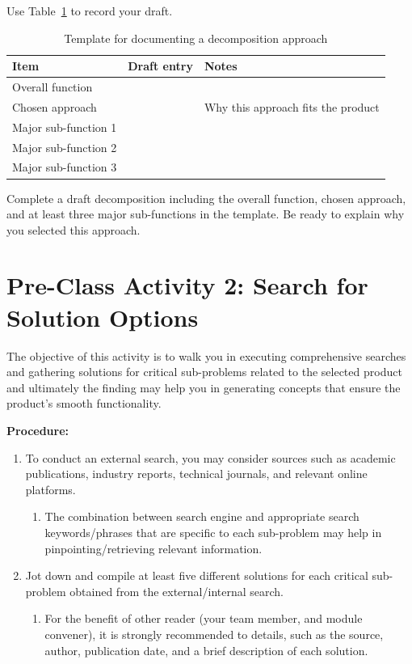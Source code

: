 Use Table~\ref{tab:session9-decomposition-template} to record your draft.

\begin{table}[htbp]
\centering
\caption{Template for documenting a decomposition approach}
\label{tab:session9-decomposition-template}
\renewcommand{\arraystretch}{1.2}
\begin{tabularx}{\textwidth}{|>{\raggedright\arraybackslash}p{}|>{\raggedright\arraybackslash}p{}|X|}
\hline
\textbf{Item} & \textbf{Draft entry} & \textbf{Notes} \\
\hline
Overall function &  &  \\
\hline
Chosen approach &  & Why this approach fits the product \\
\hline
Major sub-function 1 &  &  \\
\hline
Major sub-function 2 &  &  \\
\hline
Major sub-function 3 &  &  \\
\hline
\end{tabularx}
\end{table}

\begin{tcolorbox}[title=Checkpoint]
Complete a draft decomposition including the overall function, chosen approach, and at least three major sub-functions in the template. Be ready to explain why you selected this approach.
\end{tcolorbox}

\section{Pre-Class Activity 2: Search for Solution Options}

The objective of this activity is to walk you in executing comprehensive searches and gathering solutions for critical sub-problems related to the selected product and ultimately the finding may help you in generating concepts that ensure the product's smooth functionality.

\textbf{Procedure:}
\begin{enumerate}
    \item To conduct an external search, you may consider sources such as academic publications, industry reports, technical journals, and relevant online platforms.
    \begin{enumerate}
        \item The combination between search engine and appropriate search keywords/phrases that are specific to each sub-problem may help in pinpointing/retrieving relevant information.
    \end{enumerate}
    \item Jot down and compile at least five different solutions for each critical sub-problem obtained from the external/internal search.
    \begin{enumerate}
        \item For the benefit of other reader (your team member, and module convener), it is strongly recommended to details, such as the source, author, publication date, and a brief description of each solution.
    \end{enumerate}
\end{enumerate}

